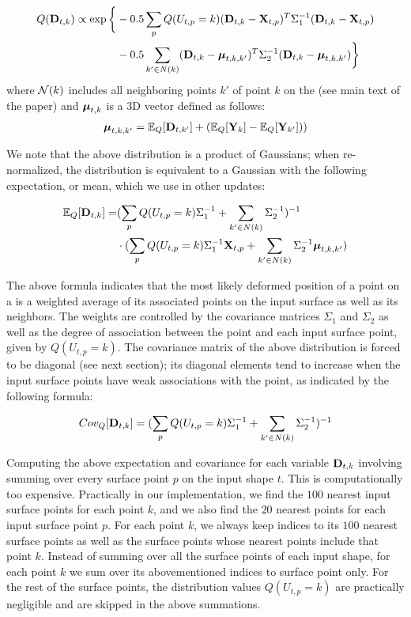 \begin{align*}
Q(\mathbf{D}_{t,k}) \propto \exp\bigg\{ & -0.5 \sum\limits_p Q(U_{t,p} = k) (\mathbf{D}_{t,k} - \mathbf{X}_{t,p})^T \Sigma_1^{-1} (\mathbf{D}_{t,k} - \mathbf{X}_{t,p}) \\
& -0.5 \sum\limits_{k' \in N(k)} (\mathbf{D}_{t,k} - \mbox{\boldmath$\mu$}_{t,k,k'})^T \Sigma_2^{-1}(\mathbf{D}_{t,k} - \mbox{\boldmath$\mu$}_{t,k,k'} )  \bigg\}
\end{align*}
where $\mathcal{N}(k)$ includes all neighboring points $k'$ of point $k$ on the  (see main text of the paper) and $\mbox{\boldmath$\mu$}_{t,k}$ is a 3D vector defined as follows:
\begin{align*}
\mbox{\boldmath$\mu$}_{t,k,k'} = \mathbb{E}_Q[\mathbf{D}_{t,k'}] + ( \mathbb{E}_Q[\mathbf{Y}_{k}] - \mathbb{E}_Q[\mathbf{Y}_{k'}] ) )
\end{align*}

We note that the above distribution is a product of Gaussians; when re-normalized, the distribution is equivalent to a Gaussian with the following expectation, or mean, which we use in other updates:

\begin{align}
\mathbb{E}_Q[\mathbf{D}_{t,k}]  = & ( \sum\limits_p Q(U_{t,p} = k) \Sigma_1^{-1}  + \sum\limits_{k' \in N(k)}\Sigma_2^{-1} )^{-1}  \nonumber  \\
&\cdot ( \sum\limits_p Q(U_{t,p} = k) \Sigma_1^{-1} \mathbf{X}_{t,p} + \sum\limits_{k' \in N(k)}\Sigma_2^{-1} \mbox{\boldmath$\mu$}_{t,k,k'}  )
\label{eqn:D}
\end{align}

The above formula indicates that the most likely deformed position of a point on a  is a weighted average of its associated points on the input surface as well as its neighbors. The weights are controlled by the covariance matrices $\Sigma_1$ and $\Sigma_2$ as well as the degree of association between the  point and each input surface point, given by $Q(U_{t,p}=k)$. The covariance matrix of the above distribution is forced to be diagonal (see next section); its diagonal elements tend to increase when the input surface points have weak associations with the  point, as indicated by the following formula:

\begin{align*}
Cov_Q[\mathbf{D}_{t,k}]  = ( \sum\limits_p Q(U_{t,p} = k) \Sigma_1^{-1}  + \sum\limits_{k' \in N(k)}\Sigma_2^{-1} )^{-1}
\end{align*}

Computing the above expectation and covariance for each variable $\mathbf{D}_{t,k}$ involving summing over every surface point $p$ on the input shape $t$. This is computationally too expensive. Practically in our implementation, we find the $100$ nearest input surface points for each  point $k$, and we also find the $20$ nearest  points for each input surface point $p$. For each  point $k$, we always keep indices to its $100$ nearest surface points as well as the surface points whose nearest points include that  point $k$. Instead of summing over all the surface points of each input shape, for each  point $k$ we sum over its abovementioned indices to surface point only. For the rest of the surface points, the distribution values  $Q(U_{t,p}=k)$ are practically negligible and are skipped in the above summations.


